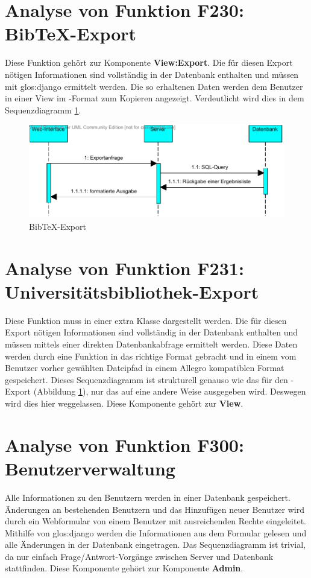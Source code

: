 \section{Analyse von Funktion F230: Bib\TeX -Export}
Diese Funktion gehört zur Komponente \textbf{View:Export}. Die für diesen Export nötigen Informationen sind vollständig in der Datenbank enthalten und müssen mit \gls{glos:django} ermittelt werden. Die so erhaltenen Daten werden dem Benutzer in einer View im \BibTeX -Format zum Kopieren angezeigt. Verdeutlicht wird dies in dem Sequenzdiagramm \ref{fig:BibTeX-Export}.

\begin{figure}[h]
\includegraphics[width=0.8\linewidth]{bilder/Seq-BibTex.pdf}
\caption[BibTeX-Export]{BibTeX-Export}
\label{fig:BibTeX-Export}
\end{figure}

\section{Analyse von Funktion F231: Universitätsbibliothek-Export}

Diese Funktion muss in einer extra Klasse dargestellt werden. Die für diesen
Export nötigen Informationen sind vollständig in der Datenbank enthalten und
müssen mittels einer direkten Datenbankabfrage ermittelt werden. Diese Daten
werden durch eine Funktion in das richtige Format gebracht und in einem vom
Benutzer vorher gewählten Dateipfad in einem Allegro kompatiblen Format
gespeichert. Dieses Sequenzdiagramm ist strukturell genauso wie das für den
\BibTeX -Export (Abbildung \ref{fig:BibTeX-Export}), nur das auf eine andere Weise ausgegeben wird. Deswegen wird dies hier weggelassen. Diese Komponente gehört zur \textbf{View}.


\section{Analyse von Funktion F300: Benutzerverwaltung}
Alle Informationen zu den Benutzern werden in einer Datenbank gespeichert. Änderungen an bestehenden Benutzern und das Hinzufügen neuer Benutzer wird durch ein Webformular von einem Benutzer mit ausreichenden Rechte eingeleitet. Mithilfe von \gls{glos:django} werden die Informationen aus dem Formular gelesen und alle Änderungen in der Datenbank eingetragen. Das Sequenzdiagramm ist trivial, da nur einfach Frage/Antwort-Vorgänge zwischen Server und Datenbank stattfinden. Diese Komponente gehört zur Komponente \textbf{Admin}.

